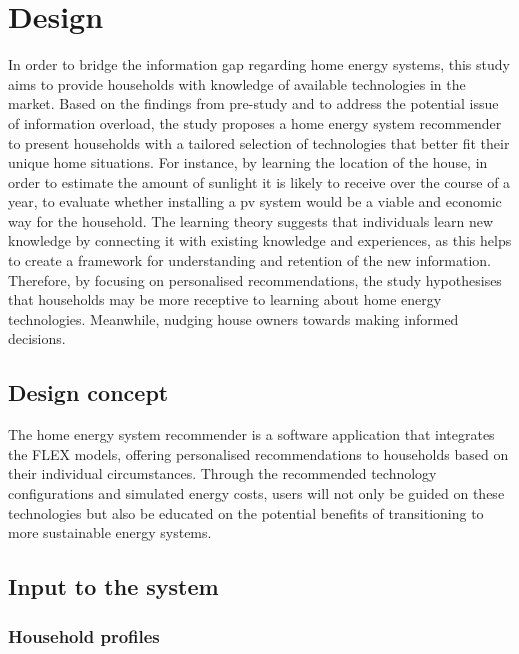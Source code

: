\chapter{Design} 

In order to bridge the information gap regarding home energy systems, this study aims to provide households with knowledge of available technologies in the market. 
Based on the findings from pre-study and to address the potential issue of information overload, the study proposes a home energy system recommender to present households with a tailored selection of technologies that better fit their unique home situations. 
For instance, by learning the location of the house, in order to estimate the amount of sunlight it is likely to receive over the course of a year, to evaluate whether installing a \gls{pv} system would be a viable and economic way for the household.
The learning theory suggests that individuals learn new knowledge by connecting it with existing knowledge and experiences, as this helps to create a framework for understanding and retention of the new information.
Therefore, by focusing on personalised recommendations, the study hypothesises that households may be more receptive to learning about home energy technologies. 
Meanwhile, nudging house owners towards making informed decisions. 


\section{Design concept}

The home energy system recommender is a software application that integrates the FLEX models,
offering personalised recommendations to households based on their individual circumstances.
Through the recommended technology configurations and simulated energy costs, 
users will not only be guided on these technologies but also be educated on the potential benefits of transitioning to more sustainable energy systems. 


\section{Input to the system}


\subsection{Household profiles}

